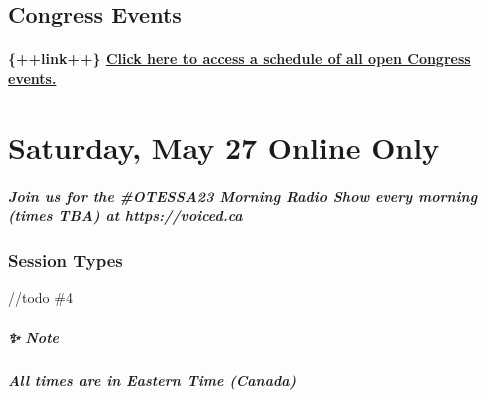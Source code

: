 \documentclass[
]{book}
\begin{document}
\hypertarget{congress-events}{%
\section*{Congress Events}\label{congress-events}}

\begin{vendor}
\hypertarget{link-click-here-to-access-a-schedule-of-all-open-congress-events.}{%
\subsubsection{\texorpdfstring{\{++link++\} \href{}{Click here to access
a schedule of all open Congress
events.}}{\{++link++\} Click here to access a schedule of all open Congress events.}}\label{link-click-here-to-access-a-schedule-of-all-open-congress-events.}}
\end{vendor}

\hypertarget{saturday-may-27-online-only}{%
\chapter{Saturday, May 27 \textbar{} Online Only}\label{saturday-may-27-online-only}}

\begin{protip}
\hypertarget{join-us-for-the-otessa23-morning-radio-show-every-morning-times-tba-at-httpsvoiced.ca}{%
\paragraph{Join us for the \#OTESSA23 Morning Radio Show every morning
(times TBA) at
https://voiced.ca}\label{join-us-for-the-otessa23-morning-radio-show-every-morning-times-tba-at-httpsvoiced.ca}}
\end{protip}

\hypertarget{session-types}{%
\subsection*{Session Types}\label{session-types}}

//todo \#4

\begin{protip}
\hypertarget{note}{%
\paragraph*{✨ Note}\label{note}}

\textbf{\emph{All times are in Eastern Time (Canada)}}
\end{protip}
\end{document}
